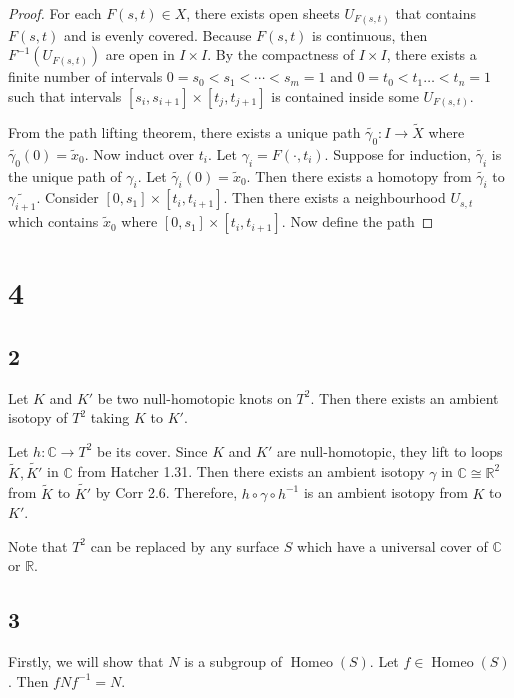 \documentclass{article}
\theoremstyle{definition}
\numberwithin{theorem}{section}
\numberwithin{equation}{section}
\DeclareMathOperator{\Homeo}{Homeo}
\begin{document}
\begin{proof}
    For each $F(s, t) \in X$, there exists open sheets $U_{F(s, t)}$ that contains $F(s, t)$ and is evenly covered. Because $F(s, t)$ is continuous, then $F^{-1}(U_{F(s, t)})$ are open in $I \times I$. By the compactness of $I \times I$, there exists a finite number of intervals $0 = s_0 < s_1 < \cdots < s_m = 1$ and $0 = t_0 < t_1 \ldots < t_n = 1$ such that intervals $[s_i, s_{i + 1}] \times [t_j, t_{j + 1}]$ is contained inside some $U_{F(s,t)}$.

    From the path lifting theorem, there exists a unique path $\widetilde{\gamma_0} : I \rightarrow \tilde{X}$ where $\widetilde{\gamma_0}(0) = \tilde{x}_0$. Now induct over $t_i$. Let $\gamma_i = F(\cdot, t_i)$. Suppose for induction, $\widetilde{\gamma_i}$ is the unique path of $\gamma_i$. Let $\widetilde{\gamma_i}(0) = \tilde{x}_0$. Then there exists a homotopy from $\widetilde{\gamma_i}$ to $\widetilde{\gamma_{i + 1}}$. Consider $[0, s_1] \times [t_i, t_{i + 1}]$. Then there exists a neighbourhood $U_{s, t}$ which contains $ \tilde{x}_0$ where $[0, s_1] \times [t_i, t_{i + 1}]$. Now define the path 
\end{proof}

\section{4}
\subsection{2}
Let $K$ and $K'$ be two null-homotopic knots on $T^2$. Then there exists an ambient isotopy of $T^2$ taking $K$ to $K'$. 

Let $h : \mathbb{C} \rightarrow T^2$ be its cover.
Since $K$ and $K'$ are null-homotopic, they lift to loops $\widetilde{K}, \widetilde{K'}$  in $\mathbb{C}$ from Hatcher 1.31. Then there exists an ambient isotopy $\gamma$ in $\mathbb{C} \cong \mathbb{R}^2$ from $\widetilde{K}$ to $\widetilde{K'}$ by Corr 2.6. Therefore, $h \circ \gamma \circ h^{-1}$ is an ambient isotopy from $K$ to $K'$. 

Note that $T^2$ can be replaced by any surface $S$ which have a universal cover of $\mathbb{C}$ or $\mathbb{R}$. 

\subsection{3}
Firstly, we will show that $N$ is a subgroup of $\Homeo(S)$. 
Let $f \in \Homeo(S)$. Then $f N f^{-1} = N$. 
\end{document}

